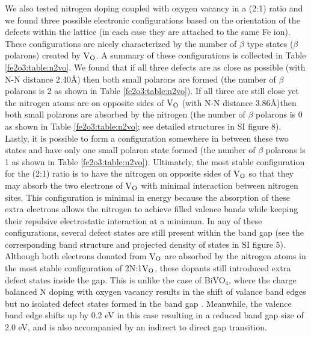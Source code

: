 We also tested nitrogen doping coupled with oxygen vacancy in a (2:1) ratio and we found three possible electronic configurations based on the orientation of the defects within the lattice (in each case they are attached to the same Fe ion). These configurations are nicely characterized by the number of $\beta$ type states ($\beta$ polarons) created by $\text{V}_\text{O}$. A summary of these configurations is collected in Table \ref{fe2o3:table:n2vo}. We found that if all three defects are as close as possible (with N-N distance 2.40\AA) then both small polarons are formed (the number of $\beta$ polarons is 2 as shown in Table \ref{fe2o3:table:n2vo}). If all three are still close yet the nitrogen atoms are on opposite sides of $\text{V}_\text{O}$ (with N-N distance 3.86\AA)then both small polarons are absorbed by the nitrogen (the number of $\beta$ polarons is 0 as shown in Table \ref{fe2o3:table:n2vo}; see detailed structures in SI figure 8). Lastly, it is possible to form a configuration somewhere in between these two states and have only one small polaron state formed (the number of $\beta$ polarons is 1 as shown in Table \ref{fe2o3:table:n2vo}). Ultimately, the most stable configuration for the (2:1) ratio is to have the nitrogen on opposite sides of $\text{V}_\text{O}$ so that they may absorb the two electrons of $\text{V}_\text{O}$ with minimal interaction between nitrogen sites. This configuration is minimal in energy because the absorption of these extra electrons allows the nitrogen to achieve filled valence bands while keeping their repulsive electrostatic interaction at a minimum. In any of these configurations, several defect states are still present within the band gap (see the corresponding band structure and projected density of states in SI figure 5).  Although both electrons donated from $\text{V}_\text{O}$ are absorbed by the nitrogen atoms in the most stable configuration of 2N:1$\text{V}_\text{O}$, these dopants still introduced extra defect states inside the gap. This is unlike the case of BiVO$_4$, where the charge balanced N doping with oxygen vacancy results in the shift of valance band edges but no isolated defect states formed in the band gap \cite{kim2015simultaneous}. Meanwhile, the valence band edge shifts up by 0.2 eV in this case resulting in a reduced band gap size of 2.0 eV, and is also accompanied by an indirect to direct
 gap transition.




